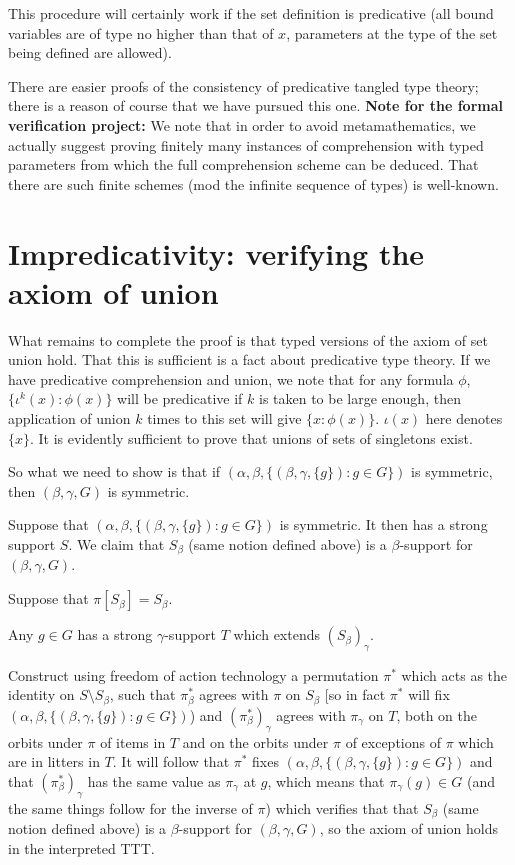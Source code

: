 This procedure will certainly work if the set definition is predicative (all bound variables are of type no higher than that of $x$, parameters at the type
of the set being defined are allowed).

There are easier proofs of the consistency of predicative tangled type theory;  there is a reason of course that we have pursued this one.
{\bf Note for the formal verification project:}  We note that in order to avoid metamathematics, we actually suggest proving finitely many instances of comprehension with typed parameters from which the full comprehension scheme can be deduced.  That there are such finite schemes (mod the infinite sequence of types) is well-known.

\newpage
\section{Impredicativity:  verifying the axiom of union}

What remains to complete the proof is that typed versions of the axiom of set union hold.  That this is sufficient is a fact about predicative type theory.
If we have predicative comprehension and union, we note that for any formula $\phi$, $\{\iota^k(x):\phi(x)\}$ will be predicative if $k$ is taken to be large enough, then application of union $k$ times to this set will give $\{x:\phi(x)\}$.  $\iota(x)$ here denotes $\{x\}$.  It is evidently sufficient to prove that unions of sets of singletons exist.

So what we need to show is that if $(\alpha,\beta,\{(\beta,\gamma,\{g\}):g \in G\})$ is symmetric, then $(\beta,\gamma,G)$ is symmetric.

Suppose that $(\alpha,\beta,\{(\beta,\gamma,\{g\}):g \in G\})$ is symmetric.  It then has a strong support $S$.  We claim that $S_\beta$ (same notion defined above) is a $\beta$-support for $(\beta,\gamma,G)$.

Suppose that $\pi[S_\beta]=S_\beta$.

Any $g \in G$ has a strong $\gamma$-support $T$ which extends $(S_\beta)_\gamma$.

Construct using freedom of action technology a permutation $\pi^*$ which acts as the identity on $S \setminus S_\beta$, such that $\pi^*_\beta$ agrees with $\pi$ on $S_\beta$ [so in fact $\pi^*$ will fix $(\alpha,\beta,\{(\beta,\gamma,\{g\}):g \in G\})$) and $(\pi^*_\beta)_\gamma$ agrees with $\pi_\gamma$ on $T$, both on the orbits under $\pi$ of items in $T$ and on the orbits under $\pi$ of exceptions of $\pi$ which are in litters in $T$.  It will follow that $\pi^*$ fixes $(\alpha,\beta,\{(\beta,\gamma,\{g\}):g \in G\})$ and that $(\pi^*_\beta)_\gamma$ has the same value as $\pi_\gamma$ at $g$, which means that $\pi_\gamma(g) \in G$ (and the same things follow for the inverse of $\pi$) which verifies that that $S_\beta$ (same notion defined above) is a $\beta$-support for $(\beta,\gamma,G)$, so the axiom of union holds in the interpreted TTT.

